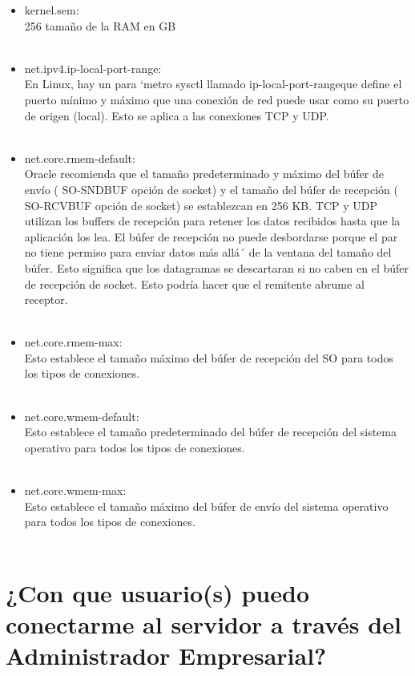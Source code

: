 \begin{itemize}
\item kernel.sem:\\
256 tamaño de la RAM en GB\\\\

\item net.ipv4.ip-local-port-range:\\
En Linux, hay un para ‘metro sysctl llamado ip-local-port-rangeque define el puerto mínimo y máximo que una conexión de red puede usar como su puerto de origen (local). Esto se aplica a las conexiones TCP y UDP.\\\\

\item net.core.rmem-default:\\
Oracle recomienda que el tamaño predeterminado y máximo del búfer de envío ( SO-SNDBUF opción de socket) y el tamaño del búfer de recepción ( SO-RCVBUF opción de socket) se establezcan en 256 KB. TCP y UDP utilizan los buffers de recepción para retener los datos recibidos hasta que la aplicación los lea. El búfer de recepción no puede desbordarse porque el par no tiene permiso para enviar datos más allá´ de la ventana del tamaño del búfer. Esto significa que los datagramas se descartaran si no caben en el búfer de recepción de socket. Esto podría hacer que el remitente abrume al receptor.\\\\
\item net.core.rmem-max:\\
Esto establece el tamaño máximo del búfer de recepción del SO para todos los tipos de conexiones.\\\\
\item net.core.wmem-default:\\
Esto establece el tamaño predeterminado del búfer de recepción del sistema operativo para todos los tipos de conexiones.\\\\
\item net.core.wmem-max:\\
Esto establece el tamaño máximo del búfer de envío del sistema operativo para todos los tipos de conexiones.\\\\


\end{itemize} 

\section{¿Con que usuario(s) puedo conectarme al servidor a través del Administrador Empresarial?} 

